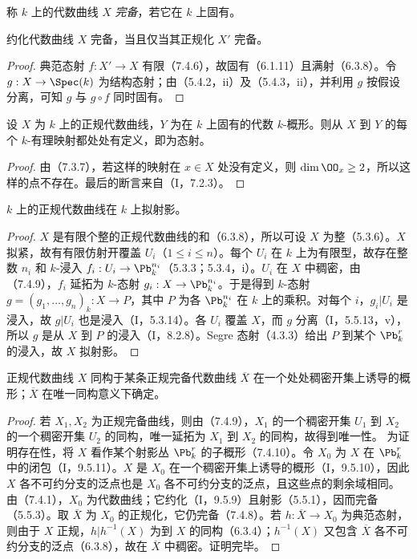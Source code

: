 称 $k$ 上的代数曲线 $X$ \emph{完备}，若它在 $k$ 上固有。

约化代数曲线 $X$ 完备，当且仅当其正规化 $X'$ 完备。
\begin{proof}
典范态射 $f:X'\to X$ 有限（7.4.6），故固有（6.1.11）且满射（6.3.8）。令 $g:X\to\Spec(k)$ 为结构态射；由（5.4.2，ii）及（5.4.3，ii），并利用 $g$ 按假设分离，可知 $g$ 与 $g\circ f$ 同时固有。
\end{proof}

设 $X$ 为 $k$ 上的正规代数曲线，$Y$ 为在 $k$ 上固有的代数 $k$-概形。则从 $X$ 到 $Y$ 的每个 $k$-有理映射都处处有定义，即为态射。
\begin{proof}
由（7.3.7），若这样的映射在 $x\in X$ 处没有定义，则 $\dim\OO_x\geq2$，所以这样的点不存在。最后的断言来自（I，7.2.3）。
\end{proof}

$k$ 上的正规代数曲线在 $k$ 上拟射影。
\begin{proof}
$X$ 是有限个整的正规代数曲线的和（6.3.8），所以可设 $X$ 为整（5.3.6）。$X$ 拟紧，故有有限仿射开覆盖 $U_i$（$1\leq i\leq n$）。每个 $U_i$ 在 $k$ 上为有限型，故存在整数 $n_i$ 和 $k$-浸入 $f_i:U_i\to\Pb_k^{n_i}$（5.3.3；5.3.4，i）。$U_i$ 在 $X$ 中稠密，由（7.4.9），$f_i$ 延拓为 $k$-态射 $g_i:X\to\Pb_k^{n_i}$。于是得到 $k$-态射 $g=(g_1,\ldots,g_n)_k:X\to P$，其中 $P$ 为各 $\Pb_k^{n_i}$ 在 $k$ 上的乘积。对每个 $i$，$g_i|U_i$ 是浸入，故 $g|U_i$ 也是浸入（I，5.3.14）。各 $U_i$ 覆盖 $X$，而 $g$ 分离（I，5.5.13，v），所以 $g$ 是从 $X$ 到 $P$ 的浸入（I，8.2.8）。Segre 态射（4.3.3）给出 $P$ 到某个 $\Pb_k^r$ 的浸入，故 $X$ 拟射影。
\end{proof}

正规代数曲线 $X$ 同构于某条正规完备代数曲线 $\overline X$ 在一个处处稠密开集上诱导的概形；$\overline X$ 在唯一同构意义下确定。
\begin{proof}
若 $X_1,X_2$ 为正规完备曲线，则由（7.4.9），$X_1$ 的一个稠密开集 $U_1$ 到 $X_2$ 的一个稠密开集 $U_2$ 的同构，唯一延拓为 $X_1$ 到 $X_2$ 的同构，故得到唯一性。
为证明存在性，将 $X$ 看作某个射影丛 $\Pb_k^r$ 的子概形（7.4.10）。令 $X_0$ 为 $X$ 在 $\Pb_k^r$ 中的闭包（I，9.5.11）。$X$ 是 $X_0$ 在一个稠密开集上诱导的概形（I，9.5.10），因此 $X$ 各不可约分支的泛点也是 $X_0$ 各不可约分支的泛点，且这些点的剩余域相同。由（7.4.1），$X_0$ 为代数曲线；它约化（I，9.5.9）且射影（5.5.1），因而完备（5.5.3）。取 $\overline X$ 为 $X_0$ 的正规化，它仍完备（7.4.8）。若 $h:\overline X\to X_0$ 为典范态射，则由于 $X$ 正规，$h|h^{-1}(X)$ 为到 $X$ 的同构（6.3.4）；$h^{-1}(X)$ 又包含 $\overline X$ 各不可约分支的泛点（6.3.8），故在 $\overline X$ 中稠密。证明完毕。
\end{proof}

